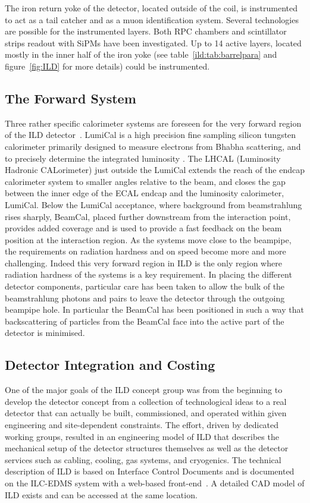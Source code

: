 \documentclass[%
 amsmath,amssymb,
 aps,
 longbibliography,
]{revtex4-1}
\begin{document}
The iron return yoke of the detector, located outside of the coil, is instrumented to act as a tail catcher and as a muon identification system. Several technologies are possible for the instrumented layers. Both RPC chambers and scintillator strips readout with SiPMs have been investigated. Up to 14 active layers, located mostly in the inner half of the iron yoke (see table~\ref{ild:tab:barrelpara} and figure~\ref{fig:ILD} for more details) could be instrumented.

\subsection{The Forward System}
Three rather specific calorimeter systems are foreseen for the very forward region of the ILD detector~\cite{Abramowicz:2010bg}. LumiCal is a high precision fine sampling silicon tungsten calorimeter primarily designed to measure electrons from Bhabha scattering, and to precisely determine the integrated luminosity \cite{Bozovic-Jelisavcic:2014aza}. The LHCAL (Luminosity Hadronic CALorimeter) just outside the LumiCal extends the reach of the endcap calorimeter system to smaller angles relative to the beam, and closes the gap between the inner edge of the ECAL endcap and the luminosity calorimeter, LumiCal.  Below the LumiCal acceptance, where background from beamstrahlung rises sharply, BeamCal, placed further downstream from the interaction point, provides added coverage and is used to provide a fast feedback on the beam position at the interaction region. As the systems move close to the beampipe, the requirements on radiation hardness and on speed become more and more challenging. Indeed this very forward region in ILD is the only region where radiation hardness of the systems is a key requirement. In placing the different detector components, particular care has been taken to allow the bulk of the beamstrahlung photons and pairs to leave the detector through the outgoing beampipe hole. In particular the BeamCal has been positioned in such a way that backscattering of particles from the BeamCal face into the active part of the detector is minimised.

\subsection{Detector Integration and Costing}
One of the major goals of the ILD concept group was from the beginning to develop the detector concept from a collection of technological ideas to a real detector that can actually be built, commissioned, and operated within given engineering and site-dependent constraints. The effort, driven by dedicated working groups, resulted in an engineering model of ILD that describes the mechanical setup of the detector structures themselves as well as the detector services such as cabling, cooling, gas systems, and cryogenics. The technical description of ILD is based on Interface Control Documents and is documented on the ILC-EDMS system with a web-based front-end~\cite{EDMS}. A detailed CAD model of ILD exists and can be accessed at the same location.
\end{document}
